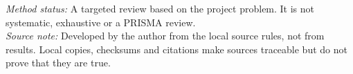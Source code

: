 \begin{table}[p]
  \caption{How sources were found, saved and checked}
  \label{tab:review-source-admission}
  \vspace{3pt}

  \parbox{\textwidth}{\scriptsize
    \textit{Method status:} A targeted review based on the project problem. It is not systematic, exhaustive or a PRISMA review.\\
    \textit{Source note:} Developed by the author from the local source rules, not from results. Local copies, checksums and citations make sources traceable but do not prove that they are true.
  }
\end{table}
\clearpage

